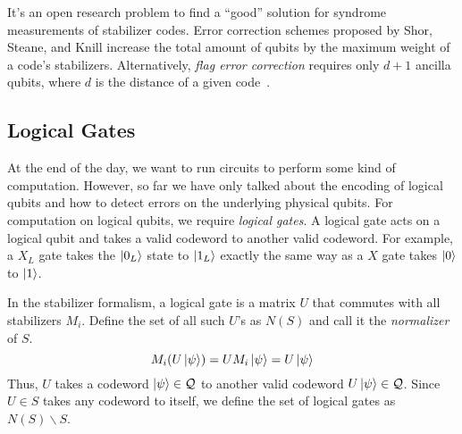\smallskip 

\noindent
It's an open research problem to find a ``good'' solution for syndrome measurements of stabilizer codes. Error correction schemes proposed by Shor, Steane, and Knill increase the total amount of qubits by the maximum weight of a code's stabilizers. Alternatively, \textit{flag error correction} requires only $d+1$ ancilla qubits, where $d$ is the distance of a given code~\cite{Chao_2020}.

\subsection{Logical Gates}

At the end of the day, we want to run circuits to perform some kind of computation. However, so far we have only talked about the encoding of logical qubits and how to detect errors on the underlying physical qubits. For computation on logical qubits, we require \textit{logical gates}. A logical gate acts on a logical qubit and takes a valid codeword to another valid codeword. For example, a $X_{L}$ gate takes the $\ket{0_L}$ state to $\ket{1_L}$ exactly the same way as a $X$ gate takes $\ket{0}$ to $\ket{1}$.

In the stabilizer formalism, a logical gate is a matrix $U$ that commutes with all stabilizers $M_i$. Define the set of all such $U$'s as $N(S)$ and call it the \textit{normalizer} of $S$.
\begin{equation}
    M_{i}(U\ket{\psi}) = UM_{i}\ket{\psi} = U\ket{\psi}\label{eq:stabilizers-logical-operators}
\end{equation}
Thus, $U$ takes a codeword $\ket{\psi} \in \mathcal{Q}$ to another valid codeword $U\ket{\psi} \in \mathcal{Q}$. Since $U \in S$ takes any codeword to itself, we define the set of logical gates as $N(S) \backslash S$.

